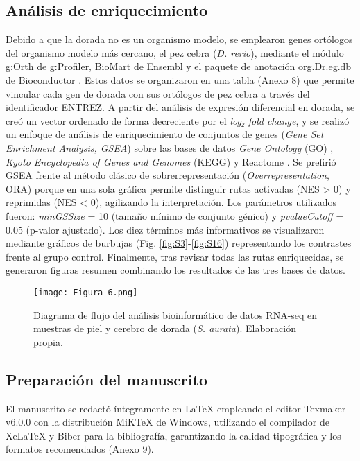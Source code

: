 \documentclass[10pt,a4paper]{article}
\begin{document}
\subsection{Análisis de enriquecimiento}  
Debido a que la dorada no es un organismo modelo, se emplearon genes ortólogos del organismo modelo más cercano, el pez cebra (\textit{D. rerio}), mediante el módulo g:Orth de g:Profiler, BioMart de Ensembl y el paquete de anotación org.Dr.eg.db de Bioconductor \parencite{Kolberg2023}. Estos datos se organizaron en una tabla (Anexo 8) que permite vincular cada gen de dorada con sus ortólogos de pez cebra a través del identificador ENTREZ. A partir del análisis de expresión diferencial en dorada, se creó un vector ordenado de forma decreciente por el \textit{log₂ fold change}, y se realizó un enfoque de análisis de enriquecimiento de conjuntos de genes (\textit{Gene Set Enrichment Analysis, GSEA}) sobre las bases de datos \textit{Gene Ontology} (GO) \parencite{GOConsortium2019}, \textit{Kyoto Encyclopedia of Genes and Genomes} (KEGG) \parencite{Kanehisa2017} y Reactome \parencite{Milacic2024}. Se prefirió GSEA frente al método clásico de sobrerrepresentación (\textit{Overrepresentation}, ORA) porque en una sola gráfica permite distinguir rutas activadas (NES > 0) y reprimidas (NES < 0), agilizando la interpretación. Los parámetros utilizados fueron: \textit{minGSSize} = 10 (tamaño mínimo de conjunto génico) y \textit{pvalueCutoff} = 0.05 (p-valor ajustado). Los diez términos más informativos se visualizaron mediante gráficos de burbujas (Fig. \ref{fig:S3}-\ref{fig:S16}) representando los contrastes frente al grupo control. Finalmente, tras revisar todas las rutas enriquecidas, se generaron figuras resumen combinando los resultados de las tres bases de datos.

\begin{figure}[ht]
  \centering
 \texttt{[image: Figura\_6.png]}

  \caption{Diagrama de flujo del análisis bioinformático de datos RNA-seq en muestras de piel y cerebro de dorada (\textit{S. aurata}). Elaboración propia.}
  \label{fig:6}
\end{figure}

\subsection{Preparación del manuscrito}
El manuscrito se redactó íntegramente en LaTeX empleando el editor Texmaker v6.0.0 con la distribución MiKTeX de Windows, utilizando el compilador de XeLaTeX y Biber para la bibliografía, garantizando la calidad tipográfica y los formatos recomendados (Anexo 9).
\end{document}
